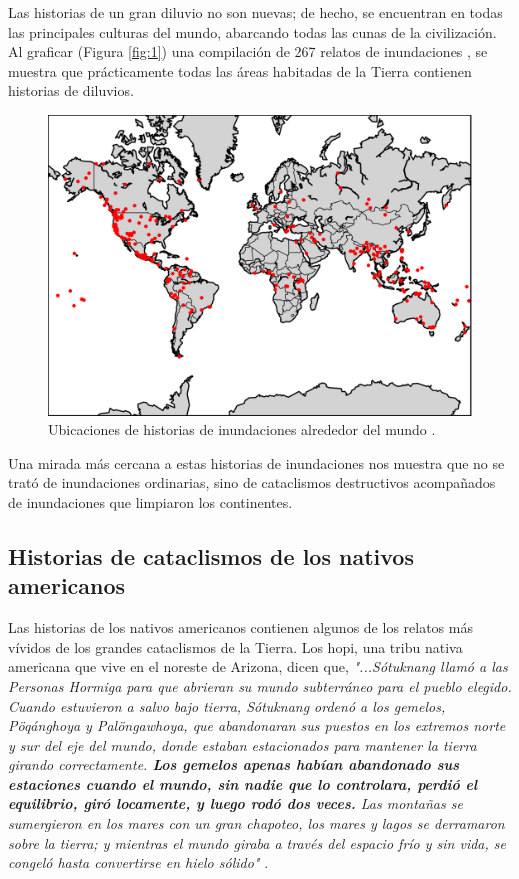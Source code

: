 \documentclass[10pt,twocolumn,letterpaper]{article}
\begin{document}
Las historias de un gran diluvio no son nuevas; de hecho, se encuentran en todas las principales culturas del mundo, abarcando todas las cunas de la civilización. Al graficar (Figura \ref{fig:1}) una compilación de 267 relatos de inundaciones \cite{3}, se muestra que prácticamente todas las áreas habitadas de la Tierra contienen historias de diluvios.

\begin{figure}[h]
\begin{center}
   \includegraphics[width=1\linewidth]{b.png}
\end{center}
   \caption{Ubicaciones de historias de inundaciones alrededor del mundo \cite{3}.}
\label{fig:1}
\label{fig:onecol}
\end{figure}

Una mirada más cercana a estas historias de inundaciones nos muestra que no se trató de inundaciones ordinarias, sino de cataclismos destructivos acompañados de inundaciones que limpiaron los continentes.

\subsection{Historias de cataclismos de los nativos americanos}

Las historias de los nativos americanos contienen algunos de los relatos más vívidos de los grandes cataclismos de la Tierra. Los hopi, una tribu nativa americana que vive en el noreste de Arizona, dicen que, \textit{"...Sótuknang llamó a las Personas Hormiga para que abrieran su mundo subterráneo para el pueblo elegido. Cuando estuvieron a salvo bajo tierra, Sótuknang ordenó a los gemelos, Pöqánghoya y Palöngawhoya, que abandonaran sus puestos en los extremos norte y sur del eje del mundo, donde estaban estacionados para mantener la tierra girando correctamente. \textbf{Los gemelos apenas habían abandonado sus estaciones cuando el mundo, sin nadie que lo controlara, perdió el equilibrio, giró locamente, y luego rodó dos veces.} Las montañas se sumergieron en los mares con un gran chapoteo, los mares y lagos se derramaron sobre la tierra; y mientras el mundo giraba a través del espacio frío y sin vida, se congeló hasta convertirse en hielo sólido"} \cite{4}.
\end{document}
